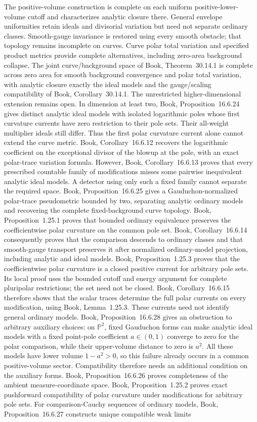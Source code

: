\documentclass[11pt]{article}
\begin{document}
The positive-volume construction is complete on each uniform positive-lower-volume cutoff and characterizes analytic closure there. General envelope uniformities retain ideals and divisorial variation but need not separate ordinary classes. Smooth-gauge invariance is restored using every smooth obstacle; that topology remains incomplete on curves. Curve polar total variation and specified product metrics provide complete alternatives, including zero-area background collapse. The joint curve/background space of Book, Theorem~30.14.1 is complete across zero area for smooth background convergence and polar total variation, with analytic closure exactly the ideal models and the gauge/scaling compatibility of Book, Corollary~30.14.1. The unrestricted higher-dimensional extension remains open. In dimension at least two, Book, Proposition~16.6.24 gives distinct analytic ideal models with isolated logarithmic poles whose first curvature currents have zero restriction to their pole sets. Their all-weight multiplier ideals still differ. Thus the first polar curvature current alone cannot extend the curve metric. Book, Corollary~16.6.12 recovers the logarithmic coefficient on the exceptional divisor of the blowup at the pole, with an exact polar-trace variation formula. However, Book, Corollary~16.6.13 proves that every prescribed countable family of modifications misses some pairwise inequivalent analytic ideal models. A detector using only such a fixed family cannot separate the required space. Book, Proposition~16.6.25 gives a Gauduchon-normalized polar-trace pseudometric bounded by two, separating analytic ordinary models and recovering the complete fixed-background curve topology. Book, Proposition~1.25.1 proves that bounded ordinary equivalence preserves the coefficientwise polar curvature on the common pole set. Book, Corollary~16.6.14 consequently proves that the comparison descends to ordinary classes and that smooth-gauge transport preserves it after normalized ordinary-model projection, including analytic and ideal models. Book, Proposition~1.25.3 proves that the coefficientwise polar curvature is a closed positive current for arbitrary pole sets. Its local proof uses the bounded cutoff and energy argument for complete pluripolar restrictions; the set need not be closed. Book, Corollary~16.6.15 therefore shows that the scalar traces determine the full polar currents on every modification, using Book, Lemma~1.25.3. These currents need not identify general ordinary models. Book, Proposition~16.6.28 gives an obstruction to arbitrary auxiliary choices: on $\mathbb P^2$, fixed Gauduchon forms can make analytic ideal models with a fixed point-pole coefficient $a\in(0,1)$ converge to zero for the polar comparison, while their upper-volume distance to zero is $a^2$. All these models have lower volume $1-a^2>0$, so this failure already occurs in a common positive-volume sector. Compatibility therefore needs an additional condition on the auxiliary forms. Book, Proposition~16.6.26 proves completeness of the ambient measure-coordinate space. Book, Proposition~1.25.2 proves exact pushforward compatibility of polar curvature under modifications for arbitrary pole sets. For comparison-Cauchy sequences of ordinary models, Book, Proposition~16.6.27 constructs unique compatible weak limits 
\end{document}
